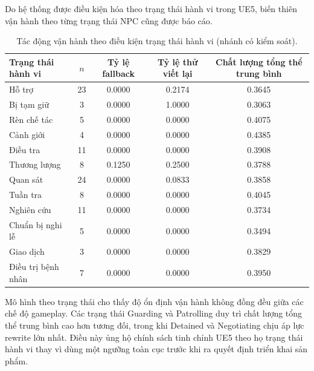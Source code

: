 ﻿\documentclass[a4paper,12pt]{article}
\begin{document}
Do hệ thống được điều kiện hóa theo trạng thái hành vi trong UE5, biến thiên vận hành theo từng trạng thái NPC cũng được báo cáo.

\begin{table}[t]
\centering
\caption{Tác động vận hành theo điều kiện trạng thái hành vi (nhánh có kiểm soát).}
\label{tab:ue5_state_operational}
\begingroup
\footnotesize
\setlength{\tabcolsep}{4pt}
\begin{tabular}{lcccc}
\toprule
Trạng thái hành vi & \(n\) & Tỷ lệ fallback & Tỷ lệ thử viết lại & Chất lượng tổng thể trung bình \\
\midrule
Hỗ trợ & 23 & 0.0000 & 0.2174 & 0.3645 \\
Bị tạm giữ & 3 & 0.0000 & 1.0000 & 0.3063 \\
Rèn chế tác & 5 & 0.0000 & 0.0000 & 0.4075 \\
Cảnh giới & 4 & 0.0000 & 0.0000 & 0.4385 \\
Điều tra & 11 & 0.0000 & 0.0000 & 0.3908 \\
Thương lượng & 8 & 0.1250 & 0.2500 & 0.3788 \\
Quan sát & 24 & 0.0000 & 0.0833 & 0.3858 \\
Tuần tra & 8 & 0.0000 & 0.0000 & 0.4045 \\
Nghiên cứu & 11 & 0.0000 & 0.0000 & 0.3734 \\
Chuẩn bị nghi lễ & 5 & 0.0000 & 0.0000 & 0.3494 \\
Giao dịch & 3 & 0.0000 & 0.0000 & 0.3829 \\
Điều trị bệnh nhân & 7 & 0.0000 & 0.0000 & 0.3950 \\
\bottomrule
\end{tabular}
\endgroup
\end{table}

Mô hình theo trạng thái cho thấy độ ổn định vận hành không đồng đều giữa các chế độ gameplay. Các trạng thái Guarding và Patrolling duy trì chất lượng tổng thể trung bình cao hơn tương đối, trong khi Detained và Negotiating chịu áp lực rewrite lớn nhất. Điều này ủng hộ chính sách tinh chỉnh UE5 theo họ trạng thái hành vi thay vì dùng một ngưỡng toàn cục trước khi ra quyết định triển khai sản phẩm.
\end{document}
